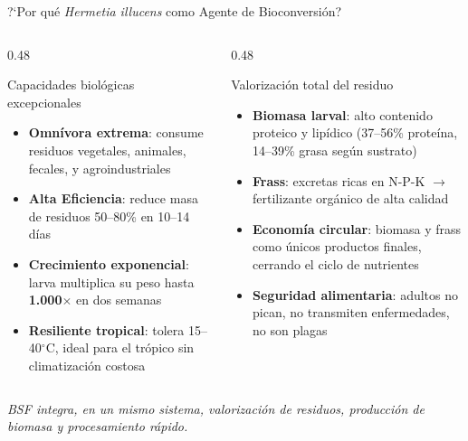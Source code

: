\documentclass[aspectratio=169, 11pt]{beamer}
\newcommand{\BSF}{\textit{Hermetia illucens}}
\begin{document}
\begin{frame}{?`Por qu\'e \BSF{} como Agente de Bioconversi\'on?}

\begin{columns}[T]

\begin{column}{0.48\textwidth}
\begin{block}{Capacidades biol\'ogicas excepcionales}
\footnotesize
\begin{itemize}
    \item \textbf{Omn\'ivora extrema}: consume residuos vegetales, animales, fecales, y
          agroindustriales~\cite{singhInclusiveApproachOrganic2019a,bermudez-serranoComprehensiveUtilizationBlack2023}
   \item \textbf{Alta Eficiencia}: reduce masa de residuos 50--80\% en 10--14 d\'ias~\cite{singhInclusiveApproachOrganic2019a,surendraBioconversionOrganicWastes2016}
    \item \textbf{Crecimiento exponencial}: larva multiplica su peso hasta 
          \textbf{1.000$\times$} en dos semanas~\cite{padmanabhaComprehensiveDynamicGrowth2020,eriksenDynamicModellingFeed2022}
    \item \textbf{Resiliente tropical}: tolera 15--40$^\circ$C, ideal para el tr\'opico 
          sin climatizaci\'on costosa~\cite{salamEffectDifferentEnvironmental2022}
\end{itemize}
\end{block}
\end{column}

\begin{column}{0.48\textwidth}
\begin{block}{Valorizaci\'on total del residuo \cite{bermudez-serranoComprehensiveUtilizationBlack2023}}
\footnotesize
\begin{itemize}
    \item \textbf{Biomasa larval}: alto contenido proteico y lip\'idico 
(37--56\% prote\'ina, 14--39\% grasa seg\'un sustrato)
    \item \textbf{Frass}: excretas ricas en N-P-K $\rightarrow$ fertilizante org\'anico de alta calidad    
    \item \textbf{Econom\'ia circular}: biomasa y frass como \'unicos productos finales, 
cerrando el ciclo de nutrientes
    \item \textbf{Seguridad alimentaria}: adultos no pican, no transmiten enfermedades, no son plagas
\end{itemize}
\end{block}
\end{column}

\end{columns}

\vspace{0.3cm}
\centering
\textit{\footnotesize BSF integra, en un mismo sistema, valorización de residuos, producción de biomasa y procesamiento rápido.}

\end{frame}
\end{document}
